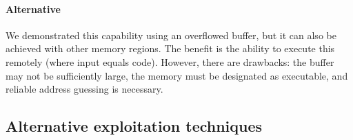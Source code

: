 \paragraph*{Alternative}
We demonstrated this capability using an overflowed buffer, but it can also be achieved with other memory regions.
The benefit is the ability to execute this remotely (where input equals code). 
However, there are drawbacks: the buffer may not be sufficiently large, the memory must be designated as executable, and reliable address guessing is necessary.

\subsection{Alternative exploitation techniques}